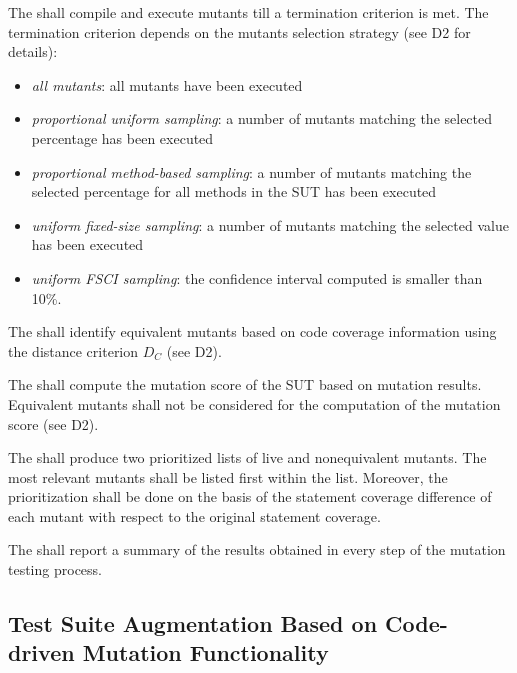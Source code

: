 
\RQ{} The \FAQAS shall compile and execute mutants till a termination criterion is met. The termination criterion depends on the mutants selection strategy (see D2 for details):
\begin{itemize}
	\item \emph{all mutants}: all mutants have been executed
	\item \emph{proportional uniform sampling}: a number of mutants matching the selected percentage has been executed
	\item \emph{proportional method-based sampling}: a number of mutants matching the selected percentage for all methods in the SUT has been executed
	\item \emph{uniform fixed-size sampling}: a number of mutants matching the selected value has been executed
	\item \emph{uniform FSCI sampling}: the confidence interval computed is smaller than 10\%.
\end{itemize}


\RQ{} The \FAQAS shall identify equivalent mutants based on code coverage information using the distance criterion $D_C$ (see D2).


\RQ{} The \FAQAS shall compute the mutation score of the SUT based on mutation results. Equivalent mutants shall not be considered for the computation of the mutation score (see D2).

\RQ{} The \FAQAS shall produce two prioritized lists of live and nonequivalent mutants. 
The most relevant mutants shall be listed first within the list. Moreover, the prioritization shall be done on the basis of the statement coverage difference of each mutant with respect to the original statement coverage.



\RQ{} The \FAQAS shall report a summary of the results obtained in every step of the mutation testing process.



\subsection{Test Suite Augmentation Based on Code-driven Mutation Functionality}
\label{sec:codeDrivenAugmentation}

